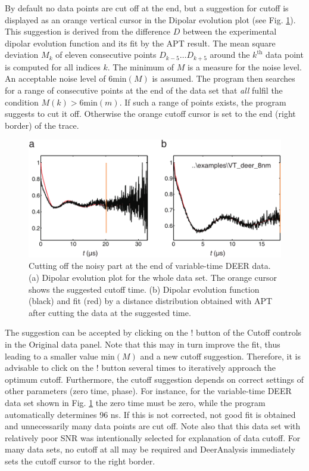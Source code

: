 \documentclass{article}
\begin{document}
By default no data points are cut off at the end, but a suggestion for cutoff is displayed as an orange vertical cursor in the {\ttfamily Dipolar evolution} plot (see Fig. \ref{fig:manfig4}). This suggestion is derived from the difference $D$ between the experimental dipolar evolution function and its fit by the APT result. The mean square deviation $M_k$ of eleven consecutive points $D_{k-5}\ldots D_{k+5}$ around the $k^\mathrm{th}$ data point is computed for all indices $k$. The minimum of $M$ is a measure for the noise level. An acceptable noise level of $6 \mathrm{min}(M)$ is assumed. The program then searches for a range of consecutive points at the end of the data set that \emph{all} fulfil the condition $M(k)> 6 \mathrm{min}(m)$. If such a range of points exists, the program suggests to cut it off. Otherwise the orange cutoff cursor is set to the end (right border) of the trace.

\begin{figure}[ht]
 	\begin{center}
  \includegraphics[width=1.0\textwidth]{fig4.pdf}
	\end{center}
	\caption{Cutting off the noisy part at the end of variable-time DEER data. (a) {\ttfamily Dipolar evolution} plot for the whole data set. The orange cursor shows the suggested cutoff time. (b) Dipolar evolution function (black) and
fit (red) by a distance distribution obtained with APT after cutting the data at the suggested time.}
	\label{fig:manfig4}
\end{figure}

The suggestion can be accepted by clicking on the {\ttfamily !} button of the {\ttfamily Cutoff} controls in the {\ttfamily Original data} panel. Note that this may in turn improve the fit, thus leading to a smaller value $\mathrm{min}(M)$ and a new cutoff suggestion. Therefore, it is advisable to click on the {\ttfamily !} button several times to iteratively approach the optimum cutoff. Furthermore, the cutoff suggestion depends on correct settings of other parameters (zero time, phase). For instance, for the variable-time DEER data set shown in Fig. \ref{fig:manfig4} the zero time must be zero, while the program automatically determines 96 ns. If this is not corrected, not good fit is obtained and unnecessarily many data points are cut off. Note also that this data set with relatively poor SNR was intentionally selected for explanation of data cutoff. For many data sets, no cutoff at all may be required and DeerAnalysis immediately sets the cutoff cursor to the right border.
\end{document}
